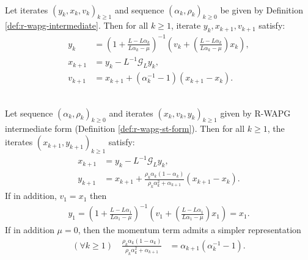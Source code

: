 \documentclass[12pt]{article}
\begin{document}
        \begin{proposition}\label{prop:wagp-st-form}\;\\
            Let iterates $(y_k, x_{k}, v_{k})_{k \ge 1}$ and sequence $(\alpha_k, \rho_k)_{k \ge 0}$ be given by Definition \ref{def:r-wapg-intermediate}. 
            Then for all $k \ge 1$, iterate $y_k, x_{k + 1}, v_{k + 1}$
            satisfy: 
            \begin{align*}
                y_{k} &= 
                \left(
                    1 + \frac{L - L\alpha_{k}}{L\alpha_{k} - \mu}
                \right)^{-1}
                \left(
                    v_{k} + 
                    \left(\frac{L - L\alpha_{k}}{L\alpha_{k} - \mu} \right) x_{k}
                \right), 
                \\
                x_{k + 1} &= 
                y_k - L^{-1} \mathcal G_L y_k, 
                \\
                v_{k + 1} &= x_{k + 1} + (\alpha_k^{-1} - 1)(x_{k + 1} - x_k). 
            \end{align*}
        \end{proposition}
        \begin{proposition}\label{prop:r-wapg-momentum-repr}
            \;\\
            Let sequence $(\alpha_k, \rho_k)_{k \ge 0}$ and iterates $(x_k, v_k, y_k)_{k\ge 1}$ given by R-WAPG intermediate form (Definition \ref{def:r-wapg-st-form}). 
            Then for all $k \ge 1$, the iterates $(x_{k + 1}, y_{k + 1})_{k \ge 1}$ satisfy: 
            \begin{align*}
                x_{k + 1} &= y_k - L^{-1}\mathcal G_Ly_k, 
                \\
                y_{k + 1} &= 
                x_{k + 1} + 
                \frac{\rho_k\alpha_k(1 - \alpha_k)}
                {\rho_k\alpha_k^2 + \alpha_{k + 1}}(x_{k + 1} - x_k). 
            \end{align*}
            If in addition, $v_1 = x_1$ then 
            \begin{align*}
                y_1 = \left(
                    1 + \frac{L - L \alpha_1}{L\alpha_1 - \mu}
                \right)^{-1}\left(
                    v_1 + \left(
                        \frac{L - L \alpha_1}{L \alpha_1 - \mu}
                    \right)x_1
                \right) = x_1. 
            \end{align*}
            If in addition $\mu = 0$, then the momentum term admits a simpler representation 
            \begin{align*}
                (\forall k \ge 1) \quad 
                \frac{\rho_k\alpha_k(1 - \alpha_k)}{\rho_k\alpha_k^2 + \alpha_{k + 1}}
                & = \alpha_{k + 1}(\alpha_k^{-1} - 1). 
            \end{align*}
        \end{proposition}
\end{document}
